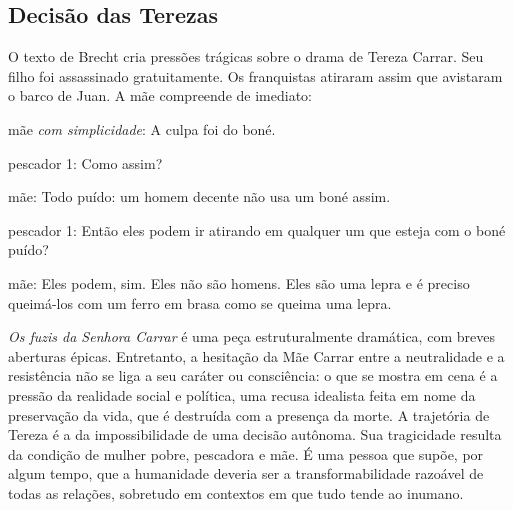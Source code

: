
\subsection{Decisão das Terezas}

O texto de Brecht cria pressões trágicas sobre o drama de Tereza Carrar.
Seu filho foi assassinado gratuitamente. Os franquistas atiraram assim
que avistaram o barco de Juan. A mãe compreende de imediato:

{\sc mãe} {\it com simplicidade}: A culpa foi do boné.

{\sc pescador} 1: Como assim?

{\sc mãe}: Todo puído: um homem decente não usa um boné assim.

{\sc pescador} 1: Então eles podem ir atirando em qualquer um que esteja com
o boné puído?

{\sc mãe}: Eles podem, sim. Eles não são homens. Eles são uma lepra e é
preciso queimá-los com um ferro em brasa como se queima uma lepra.

{\it Os fuzis da Senhora Carrar} é uma peça estruturalmente dramática,
com breves aberturas épicas. Entretanto, a hesitação da Mãe Carrar entre
a neutralidade e a resistência não se liga a seu caráter ou consciência:
o que se mostra em cena é a pressão da realidade social e política, uma
recusa idealista feita em nome da preservação da vida, que é destruída
com a presença da morte. A trajetória de Tereza é a da impossibilidade
de uma decisão autônoma. Sua tragicidade resulta da condição de mulher
pobre, pescadora e mãe. É uma pessoa que supõe, por algum tempo, que a
humanidade deveria ser a transformabilidade razoável de todas as
relações, sobretudo em contextos em que tudo tende ao inumano.


